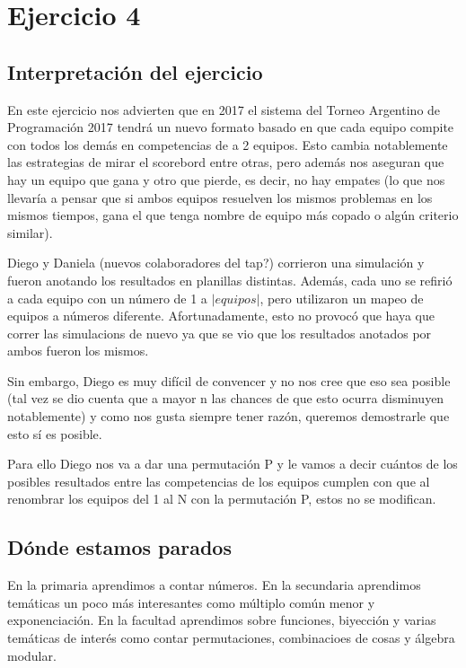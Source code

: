 \section{Ejercicio 4}

\subsection{Interpretación del ejercicio}

	En este ejercicio nos advierten que en 2017 el sistema del Torneo Argentino de Programación 2017 tendrá un nuevo formato basado en que cada equipo compite con todos los demás en competencias de a 2 equipos. Esto cambia notablemente las estrategias de mirar el scorebord entre otras, pero además nos aseguran que hay un equipo que gana y otro que pierde, es decir, no hay empates (lo que nos llevaría a pensar que si ambos equipos resuelven los mismos problemas en los mismos tiempos, gana el que tenga nombre de equipo más copado o algún criterio similar). \newline

	Diego y Daniela (nuevos colaboradores del tap?) corrieron una simulación y fueron anotando los resultados en planillas distintas. Además, cada uno se refirió a cada equipo con un número de 1 a $|equipos|$, pero utilizaron un mapeo de equipos a números diferente. Afortunadamente, esto no provocó que haya que correr las simulacions de nuevo ya que se vio que los resultados anotados por ambos fueron los mismos. \newline

	Sin embargo, Diego es muy difícil de convencer y no nos cree que eso sea posible (tal vez se dio cuenta que a mayor n las chances de que esto ocurra disminuyen notablemente) y como nos gusta siempre tener razón, queremos demostrarle que esto sí es posible. \newline

	Para ello Diego nos va a dar una permutación P y le vamos a decir cuántos de los posibles resultados entre las competencias de los equipos cumplen con que al renombrar los equipos del 1 al N con la permutación P, estos no se modifican. \newline

\subsection{Dónde estamos parados}

	En la primaria aprendimos a contar números. En la secundaria aprendimos temáticas un poco más interesantes como múltiplo común menor y exponenciación. En la facultad aprendimos sobre funciones, biyección y varias temáticas de interés como contar permutaciones, combinacioes de cosas y álgebra modular. \newline 

